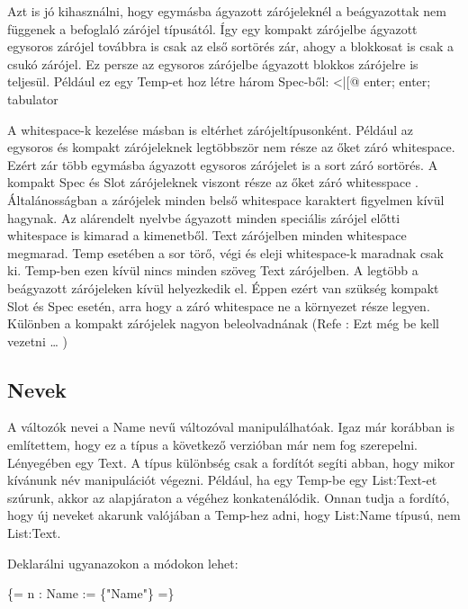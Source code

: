 {Azt is jó kihasználni, hogy egymásba ágyazott zárójeleknél a beágyazottak nem függenek a befoglaló zárójel típusától. 
Így egy kompakt zárójelbe ágyazott egysoros zárójel továbbra is csak az első sortörés zár, ahogy a blokkosat is csak a csukó zárójel. \todo{Ezt nem értem, és ez baj, mert az tényleg fontos, hogy pl. \texttt{<|[\$}-t lezárja-e az első space.} 
Ez persze az egysoros zárójelbe ágyazott blokkos zárójelre is teljesül. 
Például ez egy Temp-et hoz létre három Spec-ből: <|[@ enter; enter; tabulator

A whitespace-k kezelése másban is eltérhet zárójeltípusonként. 
Például az egysoros és kompakt zárójeleknek legtöbbször nem része az őket záró whitespace. 
Ezért zár több egymásba ágyazott egysoros zárójelet is a sort záró sortörés. 
A kompakt Spec és Slot zárójeleknek viszont része az őket záró whitesspace .
Általánosságban a zárójelek minden belső whitespace karaktert figyelmen kívül hagynak. 
Az alárendelt nyelvbe ágyazott minden speciális zárójel előtti whitespace is kimarad a kimenetből. 
Text zárójelben minden whitespace megmarad. 
Temp esetében a sor törő, végi és eleji whitespace-k maradnak csak ki. 
Temp-ben ezen kívül nincs minden szöveg Text zárójelben. 
A legtöbb a beágyazott zárójeleken kívül helyezkedik el. 
Éppen ezért van szükség kompakt Slot és Spec esetén, arra hogy a záró whitespace ne a környezet része legyen. 
Különben a kompakt zárójelek nagyon beleolvadnának (Refe : Ezt még be kell vezetni … )



\subsection{Nevek}
A változók nevei a Name nevű változóval manipulálhatóak.
Igaz már korábban is említettem, hogy ez a típus a következő verzióban már nem fog szerepelni.
Lényegében egy Text.
A típus különbség csak a fordítót segíti abban, hogy mikor kívánunk név manipulációt végezni.
Például, ha egy Temp-be egy List:Text-et szúrunk, akkor az alapjáraton a végéhez konkatenálódik.
Onnan tudja a fordító, hogy új neveket akarunk valójában a Temp-hez adni, hogy List:Name típusú, nem List:Text.

Deklarálni ugyanazokon a módokon lehet:

\{= n : Name := \{"Name"\} =\}

}
